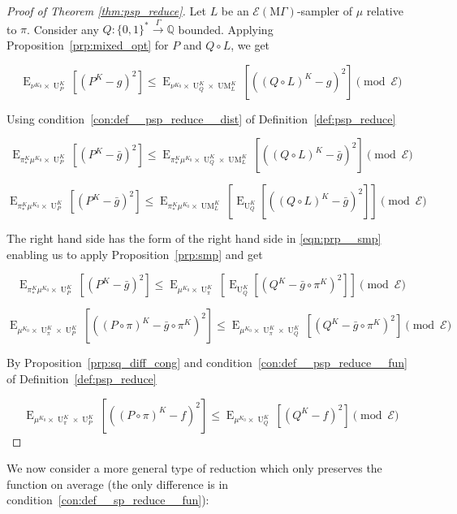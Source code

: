\documentclass{article}
\numberwithin{equation}{section}
\theoremstyle{definition}
\theoremstyle{plain}
\newcommand{\Bool}{\{0,1\}}
\newcommand{\Words}{{\Bool^*}}
\DeclareMathOperator{\E}{E}
\DeclareMathOperator{\UM}{UM}
\DeclareMathOperator{\Un}{U}
\newcommand{\Rats}{\mathbb{Q}}
\newcommand{\MGrow}{\mathrm{M}\Gamma}
\newcommand{\Fall}{\mathcal{E}}
\newcommand{\EMG}{\Fall(\MGrow)}
\newcommand{\Scheme}{\xrightarrow{\Gamma}}
\begin{document}
\begin{proof}[Proof of Theorem \ref{thm:psp_reduce}]

Let ${L}$ be an ${\EMG}$-sampler of ${\mu}$ relative to ${\pi}$. Consider any ${Q: \Words \Scheme \Rats}$ bounded. Applying Proposition~\ref{prp:mixed_opt} for ${P}$ and ${Q \circ L}$, we get

\[\E_{\nu^{K_0} \times \Un_P^K}[(P^K-g)^2] \leq \E_{\nu^{K_0} \times \Un_Q^K \times \UM_L^K}[((Q \circ L)^K - g)^2] \pmod \Fall\]

Using condition~\ref{con:def__psp_reduce__dist} of Definition~\ref{def:psp_reduce}

\[\E_{\pi_*^K\mu^{K_0} \times \Un_P^K}[(P^K-\bar{g})^2] \leq \E_{\pi_*^K\mu^{K_0} \times \Un_Q^K \times \UM_L^K}[((Q \circ L)^K - \bar{g})^2] \pmod \Fall\]

\[\E_{\pi_*^K\mu^{K_0} \times \Un_P^K}[(P^K-\bar{g})^2] \leq \E_{\pi_*^K\mu^{K_0} \times \UM_L^K}[\E_{\Un_Q^K}[((Q \circ L)^K - \bar{g})^2]] \pmod \Fall\]

The right hand side has the form of the right hand side in \ref{eqn:prp__smp} enabling us to apply Proposition~\ref{prp:smp} and get

\[\E_{\pi_*^K\mu^{K_0} \times \Un_P^K}[(P^K-\bar{g})^2] \leq \E_{\mu^{K_0} \times \Un_\pi^K}[\E_{\Un_Q^K}[(Q^K - \bar{g} \circ \pi^K)^2]] \pmod \Fall\]

\[\E_{\mu^{K_0} \times \Un_\pi^K \times \Un_P^K}[((P \circ \pi)^K-\bar{g} \circ \pi^K)^2] \leq \E_{\mu^{K_0} \times \Un_\pi^K \times \Un_Q^K}[(Q^K - \bar{g} \circ \pi^K)^2] \pmod \Fall\]

By Proposition~\ref{prp:sq_diff_cong} and condition~\ref{con:def__psp_reduce__fun} of Definition~\ref{def:psp_reduce}

\[\E_{\mu^{K_0} \times \Un_\pi^K \times \Un_P^K}[((P \circ \pi)^K-f)^2] \leq \E_{\mu^{K_0} \times \Un_Q^K}[(Q^K - f)^2] \pmod \Fall\]
%
\end{proof}

We now consider a more general type of reduction which only preserves the function on average (the only difference is in condition~\ref{con:def__sp_reduce__fun}):
\end{document}
